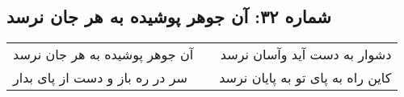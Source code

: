 \begin{center}
\section*{شماره ۳۲: آن جوهر پوشیده به هر جان نرسد}
\label{sec:032}
\begin{longtable}{l p{0.5cm} r}
آن جوهر پوشیده به هر جان نرسد
&&
دشوار به دست آید و‌آسان نرسد
\\
سر در ره باز و دست از پای بدار
&&
کاین راه به پای تو به پایان نرسد
\\
\end{longtable}
\end{center}
